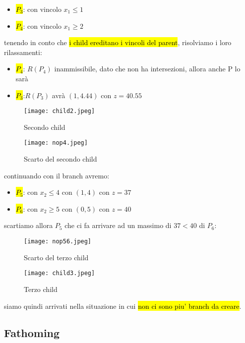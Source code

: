 \begin{itemize}
    \item \hl{$P_3$}: con vincolo $x_1 \leq 1$
    \item \hl{$P_4$}: con vincolo $x_1 \geq 2$
\end{itemize}

tenendo in conto che \hl{i child ereditano i vincoli del parent}, risolviamo i loro rilassamenti:

\begin{itemize}
    \item \hl{$P_4$}: $R(P_4)$ inammissibile, dato che non ha intersezioni, allora anche P lo sarà
    \item \hl{$P_3$}:$R(P_3)$ avrà $(1, 4.44)$ con $z = 40.55$
\end{itemize}


\begin{figure}[H]
\centering
\texttt{[image: child2.jpeg]}
\caption{Secondo child} 
\label{child2}
\end{figure}

\begin{figure}[H]
\centering
\texttt{[image: nop4.jpeg]}
\caption{Scarto del secondo child} 
\label{nop4}
\end{figure}


continuando con il branch avremo:

\begin{itemize}
    \item \hl{$P_5$}: con $x_2 \leq 4$ con $(1, 4)$ con $z = 37$
    \item \hl{$P_6$}: con $x_2 \geq 5$ con $(0, 5)$ con $z = 40$
\end{itemize} 

scartiamo allora $P_5$ che ci fa arrivare ad un massimo di $37 < 40$ di $P_6$:

\begin{figure}[H]
\centering
\texttt{[image: nop56.jpeg]}
\caption{Scarto del terzo child} 
\label{nop56}
\end{figure}

\begin{figure}[H]
\centering
\texttt{[image: child3.jpeg]}
\caption{Terzo child} 
\label{child3}
\end{figure}


siamo quindi arrivati nella situazione in cui \hl{non ci sono piu' branch da creare}.


\subsection{Fathoming}

